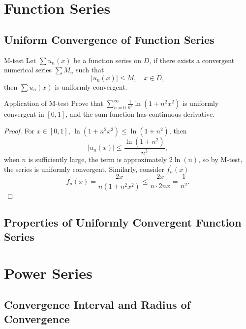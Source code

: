 \section{Function Series}

\subsection{Uniform Convergence of Function Series}

\begin{proposition}{M-test}{}
  Let $\sum u_n(x)$ be a function series on $D$,
  if there exists a convergent numerical series $\sum M_n$ such that
  \begin{equation}
    |u_n(x)| \leq M, \quad x \in D,
  \end{equation}
  then $\sum u_n(x)$ is uniformly convergent.
\end{proposition}

\begin{example}{Application of M-test}{}
  Prove that $\sum\limits_{n = 0}^{\infty} \frac{1}{n^3} \ln (1 + n^2x^2)$ is
  uniformly convergent in $[0, 1]$, and the sum function has continuous derivative.
\end{example}

\begin{proof}
  For $x \in [0, 1]$, $\ln(1 + n^2x^2) \leq \ln(1+n^2)$, then
  \begin{equation}
    |u_n(x)| \leq \frac{\ln(1 + n^2)}{n^3},
  \end{equation}
  when $n$ is sufficiently large, the term is approximately $2\ln(n)$, so by
  M-test, the series is uniformly convergent.
  Similarly, consider $f_n^{\prime}(x)$
  \begin{equation}
    f^{\prime}_n(x) = \frac{2x}{n(1+n^2x^2)} \leq \frac{2x}{n \cdot 2nx} = \frac{1}{n^2}.
  \end{equation}
\end{proof}

\subsection{Properties of Uniformly Convergent Function Series}


\section{Power Series}

\subsection{Convergence Interval and Radius of Convergence}


